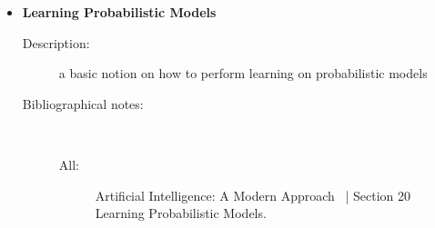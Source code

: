 \documentclass[a4paper,10pt]{article}
\theoremstyle{plain}
\begin{document}
\begin{appendices}
\begin{itemize}
\begin{description}
    \end{description}
  \item \textbf{Learning Probabilistic Models}
    \begin{description}
      \item[Description:] a basic notion on how to perform learning on probabilistic models
      \item[Bibliographical notes:]\ \
        \begin{description}
          \item[All:] Artificial Intelligence: A Modern Approach~\cite{aima} | Section 20 Learning
            Probabilistic Models.
        \end{description}
    \end{description}
\end{itemize}

\end{appendices}

\newpage

\printbibliography[heading=bibintoc]
\end{document}
